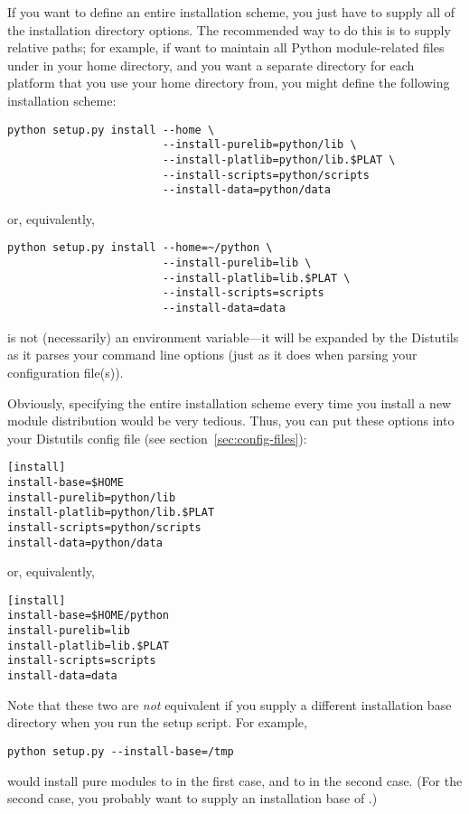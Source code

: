 \documentclass{howto}
\begin{document}
If you want to define an entire installation scheme, you just have to
supply all of the installation directory options.  The recommended way
to do this is to supply relative paths; for example, if want to maintain
all Python module-related files under  in your home
directory, and you want a separate directory for each platform that you
use your home directory from, you might define the following
installation scheme:
\begin{verbatim}
python setup.py install --home \
                        --install-purelib=python/lib \
                        --install-platlib=python/lib.$PLAT \
                        --install-scripts=python/scripts
                        --install-data=python/data
\end{verbatim}
or, equivalently,
\begin{verbatim}
python setup.py install --home=~/python \
                        --install-purelib=lib \
                        --install-platlib=lib.$PLAT \
                        --install-scripts=scripts
                        --install-data=data
\end{verbatim}
\code{\$PLAT} is not (necessarily) an environment variable---it will be
expanded by the Distutils as it parses your command line options (just
as it does when parsing your configuration file(s)).

Obviously, specifying the entire installation scheme every time you
install a new module distribution would be very tedious.  Thus, you can
put these options into your Distutils config file (see
section~\ref{sec:config-files}):
\begin{verbatim}
[install]
install-base=$HOME
install-purelib=python/lib
install-platlib=python/lib.$PLAT
install-scripts=python/scripts
install-data=python/data
\end{verbatim}
or, equivalently,
\begin{verbatim}
[install]
install-base=$HOME/python
install-purelib=lib
install-platlib=lib.$PLAT
install-scripts=scripts
install-data=data
\end{verbatim}
Note that these two are \emph{not} equivalent if you supply a different
installation base directory when you run the setup script.  For example,
\begin{verbatim}
python setup.py --install-base=/tmp
\end{verbatim}
would install pure modules to  in the first
case, and to \filevar{/tmp/lib} in the second case.  (For the second
case, you probably want to supply an installation base of
.)
\end{document}
